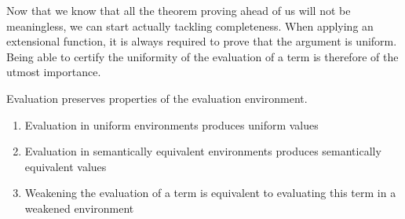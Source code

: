 \documentclass[preprint]{sigplanconf}
\begin{document}
Now that we know that all the theorem proving ahead of us will not be meaningless,
we can start actually tackling completeness. When applying an extensional function,
it is always required to prove that the argument is uniform. Being able to certify
the uniformity of the evaluation of a term is therefore of the utmost importance.

\begin{lemma} Evaluation preserves properties of the evaluation environment.
\begin{enumerate}
  \item Evaluation in uniform environments produces uniform values
  \item Evaluation in semantically equivalent environments produces semantically equivalent values
  \item Weakening the evaluation of a term is equivalent to evaluating this term in a weakened environment
\end{enumerate}
\end{lemma}
\end{document}
